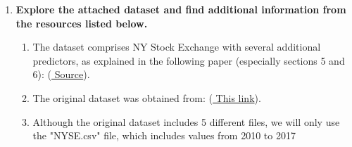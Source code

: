 \documentclass[12pt]{article}
\begin{document}
\begin{enumerate}

\item \textbf{Explore the attached dataset and find additional information from the resources listed below.}
\begin{enumerate}
\item The dataset comprises NY Stock Exchange with several additional predictors, as explained in the following paper (especially sections 5 and 6):  (\href{https://www.sciencedirect.com/science/article/abs/pii/S0957417419301915}{ Source}).
\item The original dataset was obtained from: (\href{https://archive.ics.uci.edu/ml/datasets/CNNpred\%3A+CNN-based+stock+market+prediction+using+a+diverse+set+of+variablesc}{ This link}).
\item Although the original dataset includes 5 different files, we will only use the "NYSE.csv" file, which includes values from 2010 to 2017
\end{enumerate}




\newpage

\newpage

\newpage

%









\end{enumerate}




%




\end{document}

